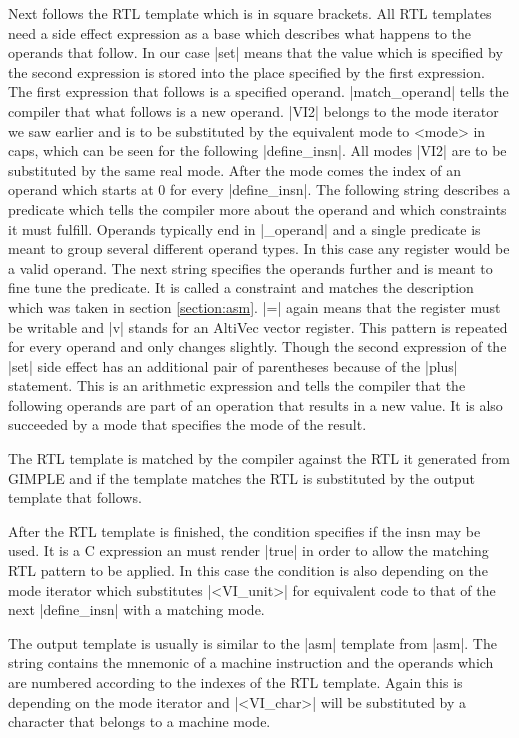 Next follows the RTL template which is in square brackets.
All RTL templates need a side effect expression as a base which describes what happens to the operands that follow.
In our case |set| means that the value which is specified by the second expression is stored into the place specified by the first expression. 
The first expression that follows is a specified operand.
|match_operand| tells the compiler that what follows is a new operand.
|VI2| belongs to the mode iterator we saw earlier and is to be substituted by the equivalent mode to <mode> in caps, which can be seen for the following |define_insn|.
All modes |VI2| are to be substituted by the same real mode.
After the mode comes the index of an operand which starts at 0 for every |define_insn|.
The following string describes a predicate which tells the compiler more about the operand and which constraints it must fulfill.
Operands typically end in |_operand| and a single predicate is meant to group several different operand types.
In this case any register would be a valid operand. 
The next string specifies the operands further and is meant to fine tune the predicate.
It is called a constraint and matches the description which was taken in section \ref{section:asm}.
|=| again means that the register must be writable and |v| stands for an AltiVec vector register.
This pattern is repeated for every operand and only changes slightly.
Though the second expression of the |set| side effect has an additional pair of parentheses because of the |plus| statement.
This is an arithmetic expression and tells the compiler that the following operands are part of an operation that results in a new value.
It is also succeeded by a mode that specifies the mode of the result.

The RTL template is matched by the compiler against the RTL it generated from GIMPLE and if the template matches the RTL is substituted by the output template that follows.

After the RTL template is finished, the condition specifies if the insn may be used.
It is a C expression an must render |true| in order to allow the matching RTL pattern to be applied.
In this case the condition is also depending on the mode iterator which substitutes |<VI_unit>| for equivalent code to that of the next |define_insn| with a matching mode. 

The output template is usually is similar to the |asm| template from |asm|.
The string contains the mnemonic of a machine instruction and the operands which are numbered according to the indexes of the RTL template.
Again this is depending on the mode iterator and |<VI_char>| will be substituted by a character that belongs to a machine mode. 

